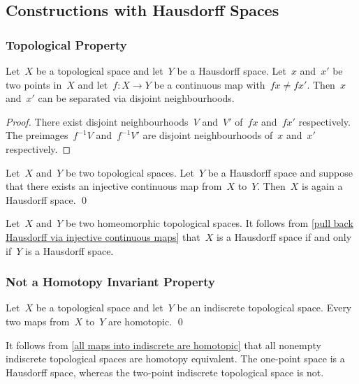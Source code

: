 \subsection{Constructions with Hausdorff Spaces}



\subsubsection{Topological Property}

\begin{lemma}
	\label{separating points with injective map into a hausdorff space}
	Let~$X$ be a topological space and let~$Y$ be a Hausdorff space.
	Let~$x$ and~$x'$ be two points in~$X$ and let~$f \colon X \to Y$ be a continuous map with~$f x ≠ f x'$.
	Then~$x$ and~$x'$ can be separated via disjoint neighbourhoods.
\end{lemma}

\begin{proof}
	There exist disjoint neighbourhoods~$V$ and~$V'$ of~$f x$ and~$f x'$ respectively.
	The preimages~$f^{-1} V$ and~$f^{-1} V'$ are disjoint neighbourhoods of~$x$ and~$x'$ respectively.
\end{proof}

\begin{proposition}
	\label{pull back Hausdorff via injective continuous maps}
	Let~$X$ and~$Y$ be two topological spaces.
	Let~$Y$ be a Hausdorff space and suppose that there exists an injective continuous map from~$X$ to~$Y$.
	Then~$X$ is again a Hausdorff space.
	\qed
\end{proposition}

Let~$X$ and~$Y$ be two homeomorphic topological spaces.
It follows from \cref{pull back Hausdorff via injective continuous maps} that~$X$ is a Hausdorff space if and only if~$Y$ is a Hausdorff space.



\subsubsection{Not a Homotopy Invariant Property}

\begin{lemma}
	\label{all maps into indiscrete are homotopic}
	Let~$X$ be a topological space and let~$Y$ be an indiscrete topological space.
	Every two maps from~$X$ to~$Y$ are homotopic.
	\qed
\end{lemma}

It follows from \cref{all maps into indiscrete are homotopic} that all nonempty indiscrete topological spaces are homotopy equivalent.
The one-point space is a Hausdorff space, whereas the two-point indiscrete topological space is not.



